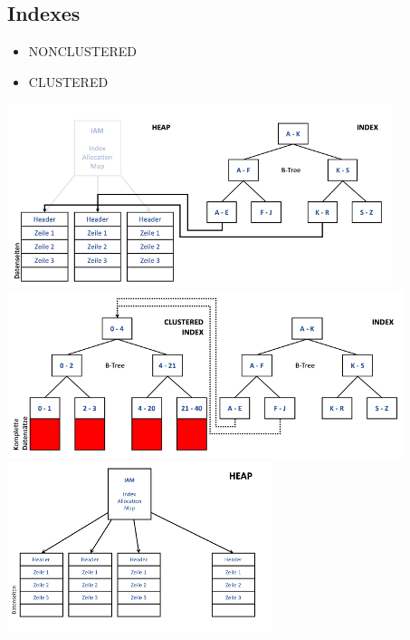 \documentclass[a4paper,8pt]{article} %
\begin{document}
\begin{small}
\begin{minipage}{0.5\linewidth}
			\section{Indexes}
				\begin{itemize}
					\item NONCLUSTERED
					\item CLUSTERED
				\end{itemize}
			 \includegraphics[width=.9\linewidth]{index}
			 \includegraphics[width=.9\linewidth]{clusteredIndex}
			 \includegraphics[width=.9\linewidth]{heap}
		\end{minipage}

\end{small}
\end{document}
